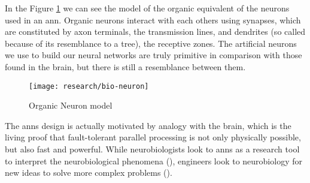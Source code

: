 In the Figure \ref{fig:org_neuron} we can see the model of the organic equivalent of the neurons used in an \gls{ann}. Organic neurons interact with each others using synapses, which are constituted by axon terminals, the transmission lines, and dendrites (so called because of its resemblance to a tree), the receptive zones. The artificial neurons we use to build our neural networks are truly primitive in comparison with those found in the brain, but there is still a resemblance between them.

\begin{figure}[!ht]
	\centering
	\texttt{[image: research/bio-neuron]}
	\caption{Organic Neuron model}
	\label{fig:org_neuron}
\end{figure}

The \glspl{ann} design is actually motivated by analogy with the brain, which is the living proof that fault-tolerant parallel processing is not only physically possible, but also fast and powerful. While neurobiologists look to \glspl{ann} as a research tool to interpret the neurobiological phenomena (\cite{anastasio1993}), engineers look to neurobiology for new ideas to solve more complex problems (\cite{mead1989}).





